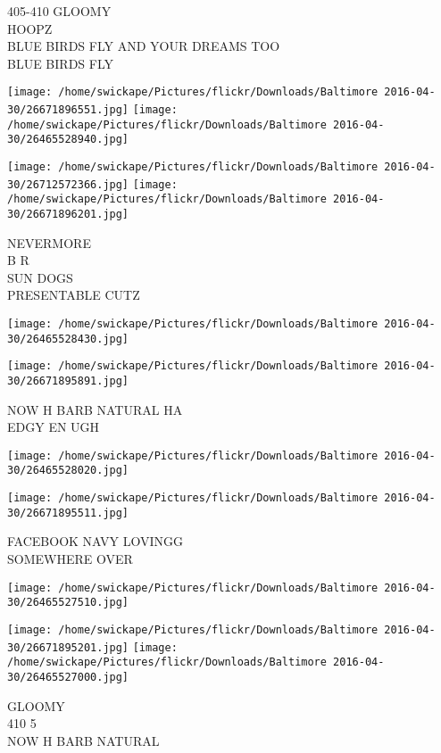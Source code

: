 \documentclass[10pt,letterpaper]{article}
\begin{document}
405{-}410 GLOOMY\\
HOOPZ\\
BLUE BIRDS FLY AND YOUR DREAMS TOO\\
BLUE BIRDS FLY
\pagebreak

\texttt{[image: /home/swickape/Pictures/flickr/Downloads/Baltimore 2016-04-30/26671896551.jpg]}
\texttt{[image: /home/swickape/Pictures/flickr/Downloads/Baltimore 2016-04-30/26465528940.jpg]}

\texttt{[image: /home/swickape/Pictures/flickr/Downloads/Baltimore 2016-04-30/26712572366.jpg]}
\texttt{[image: /home/swickape/Pictures/flickr/Downloads/Baltimore 2016-04-30/26671896201.jpg]}

NEVERMORE\\
B R\\
SUN DOGS\\
PRESENTABLE CUTZ
\pagebreak

\texttt{[image: /home/swickape/Pictures/flickr/Downloads/Baltimore 2016-04-30/26465528430.jpg]}

\vspace{0.25in}
\texttt{[image: /home/swickape/Pictures/flickr/Downloads/Baltimore 2016-04-30/26671895891.jpg]}

NOW H BARB NATURAL HA\\
EDGY EN UGH
\pagebreak

\texttt{[image: /home/swickape/Pictures/flickr/Downloads/Baltimore 2016-04-30/26465528020.jpg]}

\vspace{0.25in}
\texttt{[image: /home/swickape/Pictures/flickr/Downloads/Baltimore 2016-04-30/26671895511.jpg]}

FACEBOOK NAVY LOVINGG\\
SOMEWHERE OVER
\pagebreak

\texttt{[image: /home/swickape/Pictures/flickr/Downloads/Baltimore 2016-04-30/26465527510.jpg]}

\vspace{0.25in}
\texttt{[image: /home/swickape/Pictures/flickr/Downloads/Baltimore 2016-04-30/26671895201.jpg]}
\texttt{[image: /home/swickape/Pictures/flickr/Downloads/Baltimore 2016-04-30/26465527000.jpg]}

GLOOMY\\
410 5\\
NOW H BARB NATURAL
\pagebreak
\end{document}
